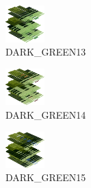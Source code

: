 \hspace{0.1cm}
\begin{minipage}[b]{0.15\linewidth}
\begin{figure}[H]                                                          
  \centering                                                             
  \begin{adjustbox}{width=1.5cm,center}                                   
  \includegraphics[width=1.5cm]{src/colorspace_colourflow/flows/colourflow_221-45.png}%
  \end{adjustbox}                                                        
\caption*{DARK\_GREEN13}                                           
\end{figure}                                                               
\end{minipage}
\hspace{0.1cm}
\begin{minipage}[b]{0.15\linewidth}
\begin{figure}[H]                                                          
  \centering                                                             
  \begin{adjustbox}{width=1.5cm,center}                                   
  \includegraphics[width=1.5cm]{src/colorspace_colourflow/flows/colourflow_222-45.png}%
  \end{adjustbox}                                                        
\caption*{DARK\_GREEN14}                                           
\end{figure}                                                               
\end{minipage}
\hspace{0.1cm}
\begin{minipage}[b]{0.15\linewidth}
\begin{figure}[H]                                                          
  \centering                                                             
  \begin{adjustbox}{width=1.5cm,center}                                   
  \includegraphics[width=1.5cm]{src/colorspace_colourflow/flows/colourflow_223-45.png}%
  \end{adjustbox}                                                        
\caption*{DARK\_GREEN15}                                           
\end{figure}                                                               
\end{minipage}
